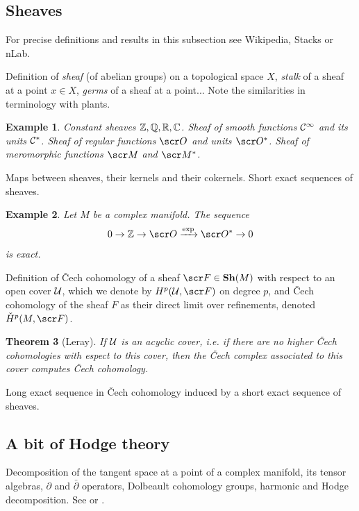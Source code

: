 \documentclass[A4paper, british]{amsart}
\theoremstyle{darkgreentheorem}
\newtheorem{thm}{Theorem}[section]
\theoremstyle{darkbluedefinition}
\theoremstyle{darkredexample}
\newtheorem{exa}[thm]{Example}
\theoremstyle{remark}
\newcommand{\1}{\mathbbm{1}}
\begin{document}
\subsection{Sheaves}

For precise definitions and results in this subsection see Wikipedia, Stacks or nLab.

Definition of \textit{sheaf} (of abelian groups) on a topological space $X$, \textit{stalk} of a sheaf at a point $x\in X$, \textit{germs} of a sheaf at a point... Note the similarities in terminology with plants.

\begin{exa}
    Constant sheaves $\mathbb{Z},\mathbb{Q},\mathbb{R},\mathbb{C}$.
    Sheaf of smooth functions $\mathcal{C}^{\infty}$ and its units $\mathcal{C}^{*}$.
    Sheaf of regular functions $\O$ and units $\O^{*}$.
    Sheaf of meromorphic functions $\M$ and $\M^{*}$.
\end{exa}

Maps between sheaves, their kernels and their cokernels.
Short exact sequences of sheaves.

\begin{exa}
    Let $M$ be a complex manifold.
    The sequence
    \[ 0\to \Z\to \O\xrightarrow{\exp} \O^{*}\to 0 \]
    is exact.
\end{exa}

Definition of \v{C}ech cohomology of a sheaf $\F\in \Sh(M)$ with respect to an open cover $\mathcal{U}$, which we denote by $H^{p}(\U,\F)$ on degree $p$, and \v{C}ech cohomology of the sheaf $F$ as their direct limit over refinements, denoted $\check{H}^{p}(M,\F)$.

\begin{thm}[Leray]
    If $\mathcal{U}$ is an acyclic cover, i.e. if there are no higher \v{C}ech cohomologies with espect to this cover, then the \v{C}ech complex associated to this cover computes \v{C}ech cohomology.
\end{thm}

Long exact sequence in \v{C}ech cohomology induced by a short exact sequence of sheaves.

\subsection{A bit of Hodge theory}

Decomposition of the tangent space at a point of a complex manifold, its tensor algebras, $\partial $ and $\bar{\partial }$ operators, Dolbeault cohomology groups, harmonic and Hodge decomposition.
See \cite{gh78} or \cite{voi07}.
\end{document}
